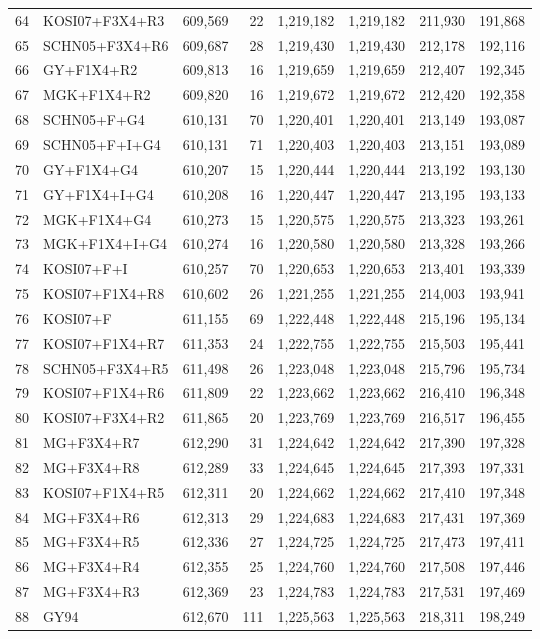 \begin{longtable}{rlrrrrrr}
64&KOSI07+F3X4+R3&609,569&22&1,219,182&1,219,182&211,930&191,868\\
65&SCHN05+F3X4+R6&609,687&28&1,219,430&1,219,430&212,178&192,116\\
66&GY+F1X4+R2&609,813&16&1,219,659&1,219,659&212,407&192,345\\
67&MGK+F1X4+R2&609,820&16&1,219,672&1,219,672&212,420&192,358\\
68&SCHN05+F+G4&610,131&70&1,220,401&1,220,401&213,149&193,087\\
69&SCHN05+F+I+G4&610,131&71&1,220,403&1,220,403&213,151&193,089\\
70&GY+F1X4+G4&610,207&15&1,220,444&1,220,444&213,192&193,130\\
71&GY+F1X4+I+G4&610,208&16&1,220,447&1,220,447&213,195&193,133\\
72&MGK+F1X4+G4&610,273&15&1,220,575&1,220,575&213,323&193,261\\
73&MGK+F1X4+I+G4&610,274&16&1,220,580&1,220,580&213,328&193,266\\
74&KOSI07+F+I&610,257&70&1,220,653&1,220,653&213,401&193,339\\
75&KOSI07+F1X4+R8&610,602&26&1,221,255&1,221,255&214,003&193,941\\
76&KOSI07+F&611,155&69&1,222,448&1,222,448&215,196&195,134\\
77&KOSI07+F1X4+R7&611,353&24&1,222,755&1,222,755&215,503&195,441\\
78&SCHN05+F3X4+R5&611,498&26&1,223,048&1,223,048&215,796&195,734\\
79&KOSI07+F1X4+R6&611,809&22&1,223,662&1,223,662&216,410&196,348\\
80&KOSI07+F3X4+R2&611,865&20&1,223,769&1,223,769&216,517&196,455\\
81&MG+F3X4+R7&612,290&31&1,224,642&1,224,642&217,390&197,328\\
82&MG+F3X4+R8&612,289&33&1,224,645&1,224,645&217,393&197,331\\
83&KOSI07+F1X4+R5&612,311&20&1,224,662&1,224,662&217,410&197,348\\
84&MG+F3X4+R6&612,313&29&1,224,683&1,224,683&217,431&197,369\\
85&MG+F3X4+R5&612,336&27&1,224,725&1,224,725&217,473&197,411\\
86&MG+F3X4+R4&612,355&25&1,224,760&1,224,760&217,508&197,446\\
87&MG+F3X4+R3&612,369&23&1,224,783&1,224,783&217,531&197,469\\
88&GY94&612,670&111&1,225,563&1,225,563&218,311&198,249\\

\end{longtable}
